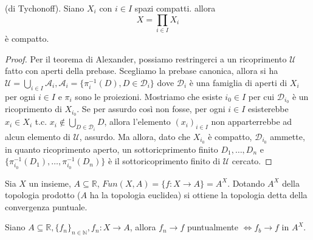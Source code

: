 \begin{thm} \label{tychonoff}
    (di Tychonoff). Siano $X_i$ con $i\in I$ spazi compatti. allora
    \[
        X=\prod_{i\in I}X_i
    \]
    \`e compatto.
\end{thm}
\begin{proof}
  Per il teorema di Alexander, possiamo restringerci a un ricoprimento $\mathcal{U}$ fatto con aperti della prebase. Scegliamo la prebase canonica, allora si ha $\displaystyle \mathcal{U}=\bigcup_{i \in I} \mathcal{A}_i, \mathcal{A}_i=\{\pi_i^{-1}(D), D \in \mathcal{D}_i\}$ dove $\mathcal{D}_i$ è una famiglia di aperti di $X_i$ per ogni $i \in I$ e $\pi_i$ sono le proiezioni.
  Mostriamo che esiste $i_0 \in I$ per cui $\mathcal{D}_{i_0}$ è un ricoprimento di $X_{i_0}$. Se per assurdo così non fosse, per ogni $i \in I$ esisterebbe $x_i \in X_i$ t.c. $\displaystyle x_i \not \in \bigcup_{D \in \mathcal{D}_i} D$, allora l'elemento $(x_i)_{i \in I}$ non apparterrebbe ad alcun elemento di $\mathcal{U}$, assurdo.
  Ma allora, dato che $X_{i_0}$ è compatto, $\mathcal{D}_{i_0}$ ammette, in quanto ricoprimento aperto, un sottoricprimento finito $D_1, \dots, D_n$ e $\{\pi_{i_0}^{-1}(D_1), \dots, \pi_{i_0}^{-1}(D_n)\}$ è il sottoricoprimento finito di $\mathcal{U}$ cercato.
\end{proof}

\begin{ex}
  Sia $X$ un insieme, $A \subseteq \mathbb{R}$, $Fun(X, A)=\{f:X \rightarrow A\}=A^X$. Dotando $A^X$ della topologia prodotto ($A$ ha la topologia euclidea) si ottiene la topologia detta della convergenza puntuale.
\end{ex}

\begin{lm}
  Siano $A \subseteq \mathbb{R}, \{f_n\}_{n \in \mathbb{N}}, f_n:X \rightarrow A$, allora $f_n \rightarrow f$ puntualmente $\Leftrightarrow f_b \rightarrow f$ in $A^X$.
\end{lm}

